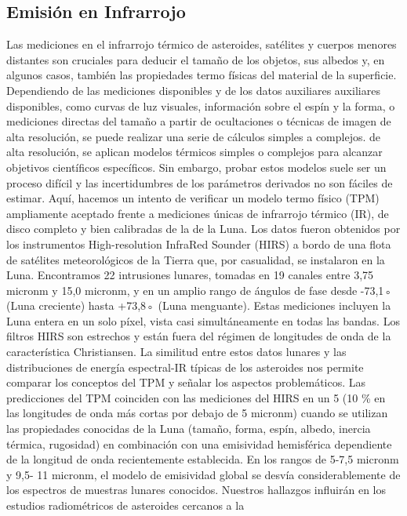 \documentclass[12pt]{article}
\begin{document}
\subsection{Emisión en Infrarrojo}\label{sec:emision_IR}
Las mediciones en el infrarrojo térmico de asteroides, satélites y cuerpos menores distantes 
son cruciales para deducir el tamaño de los objetos, sus albedos
y, en algunos casos, también las propiedades termo físicas del material de la superficie. 
Dependiendo de las mediciones disponibles y de los datos auxiliares
auxiliares disponibles, como curvas de luz visuales, información sobre el espín y la forma, 
o mediciones directas del tamaño a partir de ocultaciones o técnicas de imagen de alta 
resolución, se puede realizar una serie de cálculos simples a complejos.
de alta resolución, se aplican modelos térmicos simples o complejos para alcanzar objetivos 
científicos específicos. Sin embargo, probar estos modelos
suele ser un proceso difícil y las incertidumbres de los parámetros derivados no son fáciles 
de estimar. Aquí, hacemos un intento de verificar un modelo termo físico (TPM) ampliamente 
aceptado frente a mediciones únicas de infrarrojo térmico (IR), de disco completo y bien 
calibradas de la de la Luna. Los datos fueron obtenidos por los instrumentos High-resolution 
InfraRed Sounder (HIRS) a bordo de una flota de satélites meteorológicos de la Tierra que, 
por casualidad, se instalaron en la Luna. Encontramos 22 intrusiones lunares, tomadas en 
19 canales entre 3,75 micronm y 15,0 micronm, y en un amplio rango de ángulos de fase desde -73,1◦ 
(Luna creciente) hasta +73,8◦ (Luna menguante). Estas mediciones incluyen la Luna entera 
en un solo píxel, vista casi simultáneamente en todas las bandas. Los filtros HIRS son 
estrechos y están fuera del régimen de longitudes de onda de la característica Christiansen. 
La similitud entre estos datos lunares y las distribuciones de energía espectral-IR típicas 
de los asteroides nos permite comparar los conceptos del TPM y señalar los aspectos 
problemáticos. Las predicciones del TPM coinciden con las mediciones del HIRS en un 5
(10 \% en las longitudes de onda más cortas por debajo de 5 micronm) cuando se utilizan las 
propiedades conocidas de la Luna (tamaño, forma, espín, albedo, inercia térmica, rugosidad) 
en combinación con una emisividad hemisférica dependiente de la longitud de onda 
recientemente establecida. En los rangos de 5-7,5 micronm y 9,5- 11 micronm, el modelo de emisividad 
global se desvía considerablemente de los espectros de muestras lunares conocidos. 
Nuestros hallazgos influirán en los estudios radiométricos de asteroides cercanos a la 
\end{document}
